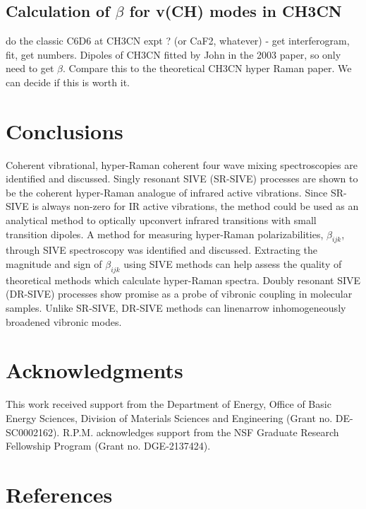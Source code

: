 \documentclass[aip, jcp, reprint, onecolumn]{revtex4-2}
\begin{document}
\subsection{Calculation of $\beta$ for v(CH) modes in CH3CN}
do the classic C6D6 at CH3CN expt ? (or CaF2, whatever) - get interferogram, fit, get numbers.
Dipoles of CH3CN fitted by John in the 2003 paper, so only need to get $\beta$. 
Compare this to the theoretical CH3CN hyper Raman paper.
We can decide if this is worth it. 


\section{Conclusions}%
Coherent vibrational, hyper-Raman coherent four wave mixing spectroscopies are identified and discussed.
Singly resonant SIVE (SR-SIVE) processes are shown to be the coherent hyper-Raman analogue of infrared active vibrations.
Since SR-SIVE is always non-zero for IR active vibrations, the method could be used as an analytical method to optically upconvert infrared transitions with small transition dipoles.
A method for measuring hyper-Raman polarizabilities, $\beta_{ijk}$, through SIVE spectroscopy was identified and discussed.
Extracting the magnitude and sign of $\beta_{ijk}$ using SIVE methods can help assess the quality of theoretical methods which calculate hyper-Raman spectra. 
Doubly resonant SIVE (DR-SIVE) processes show promise as a probe of vibronic coupling in molecular samples.
Unlike SR-SIVE, DR-SIVE methods can linenarrow inhomogeneously broadened vibronic modes. 

\section{Acknowledgments}
This work received support from the Department of Energy, Office of Basic Energy Sciences, Division of Materials Sciences and Engineering (Grant no. DE-SC0002162).
R.P.M. acknowledges support from the NSF Graduate Research Fellowship Program (Grant no. DGE-2137424). 


\section{References}

\end{document}

